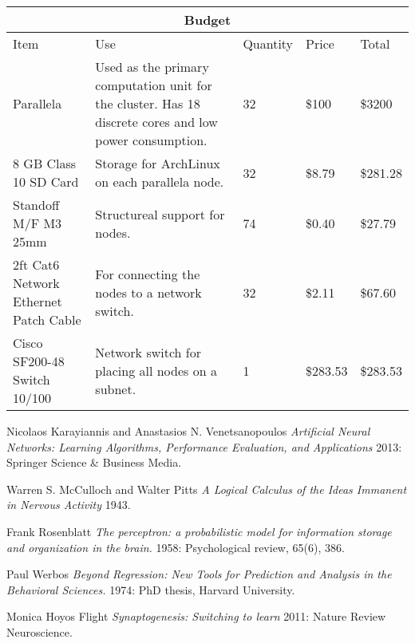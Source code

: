 \documentclass[letter]{article}
\begin{document}
\vspace{7mm}
\centering
\begin{tabular}{ |p{2cm}|p{6cm}|p{1.5cm}|p{1cm}| p{1.5cm}|
 }
 \hline
 \multicolumn{5}{|c|}{Budget} \\
 \hline
Item& Use& Quantity&Price & Total\\
 \hline
  Parallela & Used as the primary computation unit for the cluster.  Has 18 discrete cores and low power
  consumption.  & 32 & \$100  & \$3200\\
  \hline
  8 GB Class 10 SD Card & Storage for ArchLinux on each parallela node. &32 &\$8.79 &\$281.28 \\
    \hline
  Standoff M/F M3 25mm &Structureal support for nodes. &74 &\$0.40 &\$27.79 \\
    \hline
  2ft Cat6 Network Ethernet Patch Cable & For connecting the nodes to a network switch. &32 &\$2.11 &\$67.60 \\
   \hline
  Cisco SF200-48 Switch 10/100 & Network switch for placing all nodes on a subnet. &1 &\$283.53 &\$283.53 \\

 \hline
\end{tabular}
\begin{thebibliography}{1}
     Nicolaos Karayiannis and Anastasios N. Venetsanopoulos {\em
    Artificial Neural Networks: Learning Algorithms, Performance Evaluation, and Applications} 2013: Springer Science
    & Business Media.

     Warren S. McCulloch and Walter Pitts {\em A Logical Calculus of the Ideas Immanent in Nervous Activity} 1943.

     Frank Rosenblatt {\em The perceptron: a probabilistic model for information storage and organization in the brain.}
    1958: Psychological review, 65(6), 386.

     Paul Werbos {\em Beyond Regression: New Tools for Prediction and Analysis in the Behavioral Sciences.} 1974: PhD thesis,
    Harvard University.

     Monica Hoyos Flight {\em Synaptogenesis: Switching to learn} 2011: Nature Review Neuroscience.

\end{thebibliography}
\end{document}
